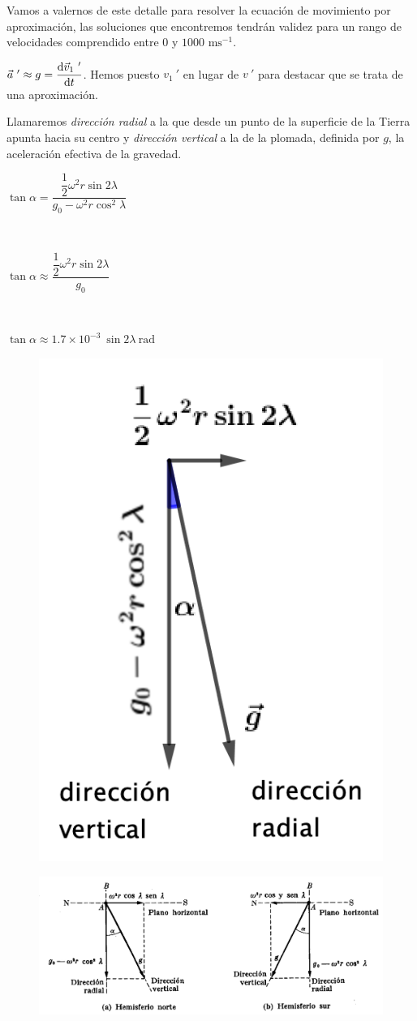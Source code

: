 Vamos a valernos de este detalle para resolver la ecuación de movimiento por aproximación, las soluciones que encontremos tendrán validez para un rango de velocidades comprendido entre $0$ y $1000 \text{ ms}^{-1}$.

$\vec a\ ' \approx g = \displaystyle \dv{\vec v_1\ '}{t}$. Hemos puesto $v_1\ '$ en lugar de $v\ '$ para destacar que se trata de una aproximación. 

Llamaremos \emph{dirección radial} a la que desde un punto de la superficie de la Tierra apunta hacia su centro y \emph{dirección vertical} a la de la plomada, definida por $g$, la aceleración efectiva de la gravedad.

\begin{multicols}{2}
$\tan \alpha=\dfrac{\dfrac 1 2 \omega^2 r \sin 2 \lambda}{g_0-\omega^2 r \cos^2\lambda}$

$\quad $

$\tan \alpha \approx \dfrac{\dfrac 1 2 \omega^2 r \sin 2 \lambda}{g_0}$

$\quad $

$\tan \alpha \approx 1.7\times 10^{-3}\ \sin 2 \lambda \ \mathrm{rad}$
\begin{figure}[H]
	\centering
	\includegraphics[width=.25\textwidth]{imagenes/imagenes11/T11IM05.png}
\end{figure}
\end{multicols}

\begin{figure}[H]
	\centering
	\includegraphics[width=.95\textwidth]{imagenes/imagenes11/T11IM06.png}
\end{figure}

